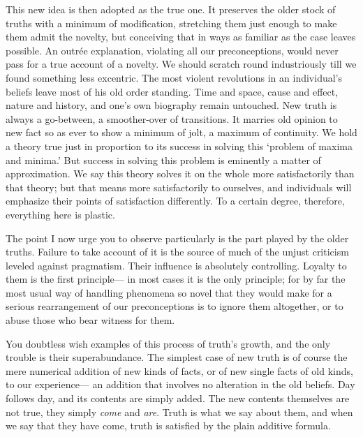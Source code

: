 \documentclass[]{article}
\begin{document}
This new idea is then adopted as the true one. It preserves the older
stock of truths with a minimum of modification, stretching them just
enough to make them admit the novelty, but conceiving that in ways as
familiar as the case leaves possible. An outr\'{e}e explanation, violating
all our preconceptions, would never pass for a true account of a
novelty. We should scratch round industriously till we found something
less excentric. The most violent revolutions in an individual's beliefs
leave most of his old order standing. Time and space, cause and effect,
nature and history, and one's own biography remain untouched. New truth
is always a go-between, a smoother-over of transitions. It marries old
opinion to new fact so as ever to show a minimum of jolt, a maximum of
continuity. We hold a theory true just in proportion to its success in
solving this `problem of maxima and minima.' But success in solving
this problem is eminently a matter of approximation. We say this theory
solves it on the whole more satisfactorily than that theory; but that
means more satisfactorily to ourselves, and individuals will emphasize
their points of satisfaction differently. To a certain degree,
therefore, everything here is plastic.

The point I now urge you to observe particularly is the part played by
the older truths. Failure to take account of it is the source of much
of the unjust criticism leveled against pragmatism. Their influence is
absolutely controlling. Loyalty to them is the first principle--- in
most cases it is the only principle; for by far the most usual way
of handling phenomena so novel that they would make for a serious
rearrangement of our preconceptions is to ignore them altogether, or to
abuse those who bear witness for them.

You doubtless wish examples of this process of truth's growth, and the
only trouble is their superabundance. The simplest case of new truth is
of course the mere numerical addition of new kinds of facts, or of new
single facts of old kinds, to our experience--- an addition that involves
no alteration in the old beliefs. Day follows day, and its contents are
simply added. The new contents themselves are not true, they simply \emph{come}
and \emph{are}. Truth is what we say about them, and when we say that they have
come, truth is satisfied by the plain additive formula.
\end{document}
